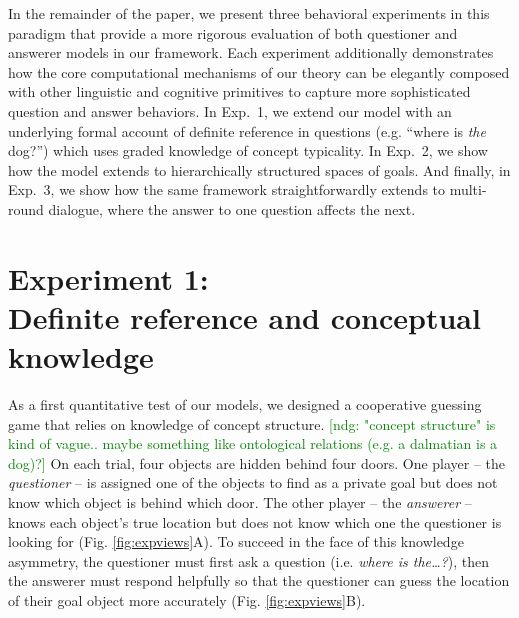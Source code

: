 \documentclass[11pt, floatsintext]{apa6}
\newcommand{\ndg}[1]{\textcolor{Green}{[ndg: #1]}}
\begin{document}

In the remainder of the paper, we present three behavioral experiments in this paradigm that provide a more rigorous evaluation of both questioner and answerer models in our framework.
Each experiment additionally demonstrates how the core computational mechanisms of our theory can be elegantly composed with other linguistic and cognitive primitives to capture more sophisticated question and answer behaviors.
In Exp.~1, we extend our model with an underlying formal account of definite reference in questions (e.g. ``where is \emph{the} dog?'') which uses graded knowledge of concept typicality.
In Exp.~2, we show how the model extends to hierarchically structured spaces of goals.
And finally, in Exp.~3, we show how the same framework straightforwardly extends to multi-round dialogue, where the answer to one question affects the next.

\section{Experiment 1: \\ Definite reference and conceptual knowledge}

As a first quantitative test of our models, we designed a cooperative guessing game that relies on knowledge of concept structure. \ndg{"concept structure" is kind of vague.. maybe something like ontological relations (e.g. a dalmatian is a dog)?}
On each trial, four objects are hidden behind four doors.
One player -- the \emph{questioner} -- is assigned one of the objects to find as a private goal but does not know which object is behind which door.
The other player -- the \emph{answerer} -- knows each object's true location but does not know which one the questioner is looking for (Fig. \ref{fig:expviews}A). 
To succeed in the face of this knowledge asymmetry, the questioner must first ask a question (i.e. \emph{where is the\dots?}), then the answerer must respond helpfully so that the questioner can guess the location of their goal object more accurately (Fig. \ref{fig:expviews}B).
\end{document}
